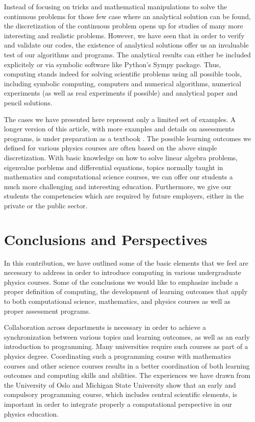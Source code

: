 \documentclass[graybox,envcountchap,sectrefs]{svmult}
\begin{document}
Instead of focusing on tricks and mathematical manipulations to solve
the continuous problems for those few case where an analytical
solution can be found, the discretization of the continuous problem
opens up for studies of many more interesting and realistic problems.
However, we have seen that in order to verify and validate our codes,
the existence of analytical solutions offer us an invaluable test of
our algorithms and programs. The analytical results can either be
included explicitely or via symbolic software like Python's Sympy package.
Thus, computing stands indeed for solving scientific problems using
all possible tools, including symbolic computing, computers and
numerical algorithms, numerical experiments (as well as real
experiments if possible) and analytical paper and pencil solutions.

The cases we have presented here represent only a limited set of
examples. A longer version of this article, with more examples and
details on assessments programs, is under preparation as a textbook
\cite{DannyMortenBook}.  The possible learning outcomes we defined for
various physics courses are often based on the above simple
discretization. With basic knowledge on how to solve linear algebra
problems, eigenvalue porblems and differential equations, topics
normally taught in mathematics and computational science courses, we
can offer our students a much more challenging and interesting
education. Furthermore, we give our students the competencies which are
required by future employers, either in the private or the public
sector.


\section{Conclusions and Perspectives}

In this contribution, we have outlined some of the basic elements that we
feel are necessary to address in order to introduce computing in
various undergraduate physics courses.  Some of the conclusions we
would like to emphasize include a proper  definition of computing,
the development of learning outcomes that apply to both computational science, mathematics,  and
physics courses as well as  proper assessment programs.

Collaboration across departments is necessary in order to achieve a
synchronization between various topics and learning outcomes, as well
as an early introduction to programming. Many universities
require such courses as part of a physics degree. Coordinating such
a programming course with mathematics courses and other science
courses results in a better coordination of both learning outcomes and
computing skills and abilities. The experiences we have drawn from the
University of Oslo and Michigan State University show that an early
and compulsory programming course, which includes central scientific elements, is
important in order to integrate properly a computational perspective
in our physics education.
\end{document}
